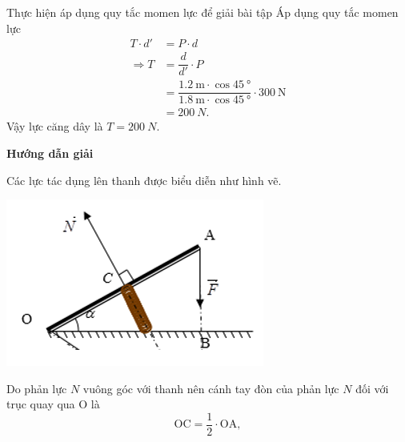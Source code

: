\begin{dang}{Thực hiện áp dụng quy tắc momen lực để giải bài tập}
{		Áp dụng quy tắc momen lực
		\begin{align*}
			T\cdot d' &= P\cdot d\\
			\Rightarrow
			T&=\dfrac{d}{ d'}\cdot P\\
			&=\dfrac{\SI{1.2}{\meter}\cdot\cos\SI{45}{\degree}}{\SI{1.8}{\meter}\cdot\cos\SI{45}{\degree}}\cdot\SI{300}{\newton}\\&=\SI{200}{N}.
		\end{align*}
		Vậy lực căng dây là $T=\SI{200}{N}$. 
	}
	{	\begin{center}
			\textbf{Hướng dẫn giải}
		\end{center}
		
		Các lực tác dụng lên thanh được biểu diễn như hình vẽ. 
		\begin{center}
			\includegraphics[scale=0.8]{../figs/VN10-PH-21-L-016-2-V2-05.png}
		\end{center}
				
		Do phản lực $N$ vuông góc với thanh nên cánh tay đòn của phản lực $N$ đối với trục quay qua O là 
		$$\textrm{OC} = \dfrac{1}{2}\cdot \textrm{OA},$$
		
}
\end{dang}
